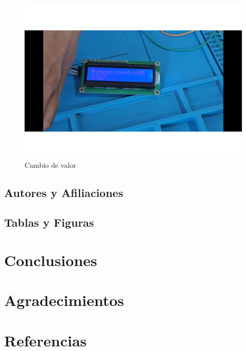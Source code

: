     
    \begin{figure}[H]
        \centering
        \includegraphics[trim = {7mm 1mm 1mm 1mm},clip,scale=0.25]{22/Img/e20.pdf}
        \caption{Cambio de valor}
        \label{fig:evi8}
    \end{figure}
    
    
    \subsection{Autores y Afiliaciones}
    
    \subsection{Tablas y Figuras}
    
    \section{Conclusiones}
    
    
    
    \section{Agradecimientos}
    
    
    \section{Referencias}
    
    
    
